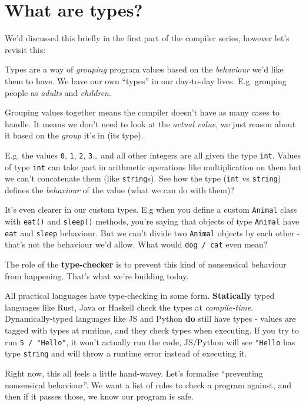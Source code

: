 \hypertarget{what-are-types}{%
\section{\texorpdfstring{\protect\hyperlink{what-are-types}{}What are
types?}{What are types?}}\label{what-are-types}}

We'd discussed this briefly in the first part of the compiler series,
however let's revisit this:

Types are a way of \emph{grouping} program values based on the
\emph{behaviour} we'd like them to have. We have our own ``types'' in
our day-to-day lives. E.g. grouping people as \emph{adults} and
\emph{children}.

Grouping values together means the compiler doesn't have as many cases
to handle. It means we don't need to look at the \emph{actual value}, we
just reason about it based on the \emph{group} it's in (its type).

E.g. the values \texttt{0}, \texttt{1}, \texttt{2}, \texttt{3}\ldots{}
and all other integers are all given the type \texttt{int}. Values of
type \texttt{int} can take part in arithmetic operations like
multiplication on them but we can't concatenate them (like
\texttt{string}s). See how the type (\texttt{int} vs \texttt{string})
defines the \emph{behaviour} of the value (what we can do with them)?

It's even clearer in our custom types. E.g when you define a custom
\texttt{Animal} class with \texttt{eat()} and \texttt{sleep()} methods,
you're saying that objects of type \texttt{Animal} have \texttt{eat} and
\texttt{sleep} behaviour. But we can't divide two \texttt{Animal}
objects by each other - that's not the behaviour we'd allow. What would
\texttt{dog\ /\ cat} even mean?

The role of the \textbf{type-checker} is to prevent this kind of
nonsensical behaviour from happening. That's what we're building today.

All practical languages have type-checking in some form.
\textbf{Statically} typed languages like Rust, Java or Haskell check the
types at \emph{compile-time}. Dynamically-typed languages like JS and
Python \textbf{do} still have types - values are tagged with types at
runtime, and they check types when executing. If you try to run
\texttt{5\ /\ "Hello"}, it won't actually run the code, JS/Python will
see \texttt{"Hello} has type \texttt{string} and will throw a runtime
error instead of executing it.

Right now, this all feels a little hand-wavey. Let's formalise
``preventing nonsensical behaviour''. We want a list of rules to check a
program against, and then if it passes those, we know our program is
safe.

